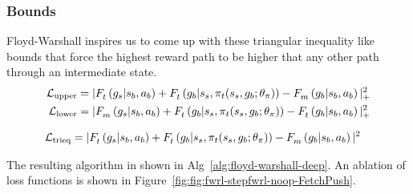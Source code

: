 \subsubsection{Bounds}
Floyd-Warshall inspires us to come up with these triangular inequality like
bounds that force the highest reward path to be higher that any other path
through an intermediate state.
%
\begin{align}
  \Loss_{\text{upper}} &= |
      \fwargs{\state_{b}}{\act_b}{\goal_s}{t}{}
      + \fwargs{\state_{s}}{\policy_t(\state_s, \goal_{b};\param_\policy)}{\goal_b}{t}{}
      - \fwargs{\state_{b}}{\act_b}{\goal_b}{m}{}
      |_+^2
                         \\
  \Loss_{\text{lower}} &= |
      \fwargs{\state_{b}}{\act_b}{\goal_s}{m}{}
      + \fwargs{\state_{s}}{\policy_t(\state_s, \goal_{b};\param_\policy)}{\goal_b}{t}{}
      - \fwargs{\state_{b}}{\act_b}{\goal_b}{t}{}
      |_+^2
\end{align}%
% 

\begin{align}
  \Loss_{\text{trieq}} &= |
      \fwargs{\state_{b}}{\act_b}{\goal_s}{t}{}
      + \fwargs{\state_{s}}{\policy_t(\state_s, \goal_{b};\param_\policy)}{\goal_b}{t}{}
      - \fwargs{\state_{b}}{\act_b}{\goal_b}{m}{}
      |^2
\end{align}

The resulting algorithm in shown in Alg~\ref{alg:floyd-warshall-deep}. An
ablation of loss functions is shown in Figure~\ref{fig:fig:fwrl-stepfwrl-noop-FetchPush}.



